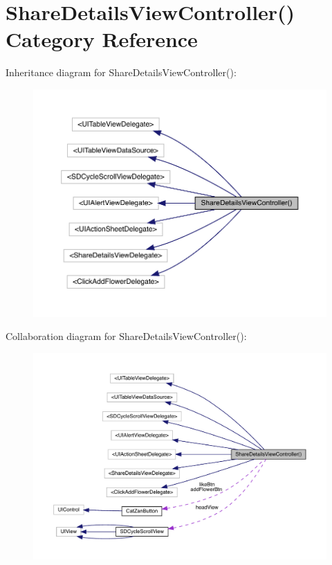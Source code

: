 \hypertarget{category_share_details_view_controller_07_08}{}\section{Share\+Details\+View\+Controller() Category Reference}
\label{category_share_details_view_controller_07_08}


Inheritance diagram for Share\+Details\+View\+Controller()\+:\nopagebreak
\begin{figure}[H]
\begin{center}
\leavevmode
\includegraphics[width=350pt]{category_share_details_view_controller_07_08__inherit__graph}
\end{center}
\end{figure}


Collaboration diagram for Share\+Details\+View\+Controller()\+:\nopagebreak
\begin{figure}[H]
\begin{center}
\leavevmode
\includegraphics[width=350pt]{category_share_details_view_controller_07_08__coll__graph}
\end{center}
\end{figure}
